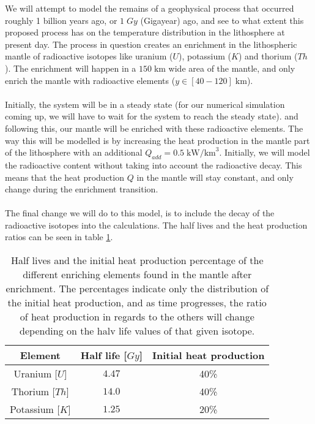 \documentclass[reprint,english,notitlepage]{revtex4-1}  %
\begin{document}
We will attempt to model the remains of a geophysical process that occurred roughly 1 billion years ago, or $1\;Gy$ (Gigayear) ago, and see to what extent this proposed process has on the temperature distribution in the lithosphere at present day. The process in question creates an enrichment in the lithospheric mantle of radioactive isotopes like uranium ($U$), potassium ($K$) and thorium ($Th$). The enrichment will happen in a $150\;\text{km}$ wide area of the mantle, and only enrich the mantle with radioactive elements ($y \in [40-120]\;\text{km}$).
\\
\\
Initially, the system will be in a steady state (for our numerical simulation coming up, we will have to wait for the system to reach the steady state). and following this, our mantle will be enriched with these radioactive elements. The way this will be modelled is by increasing the heat production in the mantle part of the lithosphere with an additional $Q_{add} = 0.5\;\text{kW/km}^3$. Initially, we will model the radioactive content without taking into account the radioactive decay. This means that the heat production $Q$ in the mantle will stay constant, and only change during the enrichment transition.
\\
\\
The final change we will do to this model, is to include the decay of the radioactive isotopes into the calculations. The half lives and the heat production ratios can be seen in table \ref{tab:halflifepercent}.
\begin{table}[h!]
    \centering
    \begin{tabular}{|c|c|c|}
        \hline 
         Element & Half life [$Gy$]& Initial heat production\\
         \hline\hline
         Uranium [$U$] &$4.47$&40\% \\
         Thorium [$Th$] & $14.0$ &40\%\\
         Potassium [$K$] & $1.25$ &20\%\\
         \hline
    \end{tabular}
    \caption{Half lives and the initial heat production percentage of the different enriching elements found in the mantle after enrichment. The percentages indicate only the distribution of the initial heat production, and as time progresses, the ratio of heat production in regards to the others will change depending on the halv life values of that given isotope.}
    \label{tab:halflifepercent}
\end{table}
\end{document}
